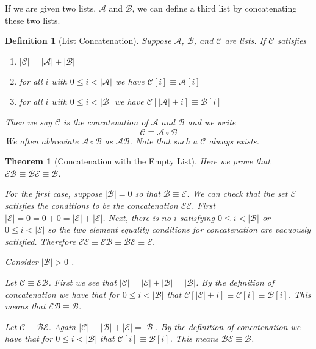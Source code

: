 \documentclass[12pt]{article}
\theoremstyle{break}
\newtheorem{definition}{Definition}[section]
\theoremstyle{break}
\newtheorem{theorem}{Theorem}[section]
\theoremstyle{break}
\theoremstyle{break}
\newcommand{\mc}[1]{\mathcal{#1}}
\begin{document}
If we are given two lists, $\mc{A}$ and $\mc{B}$, we can define a third list by concatenating these two lists.

\begin{definition}[List Concatenation]
Suppose $\mc{A}$, $\mc{B}$, and $\mc{C}$ are lists.
If $\mc{C}$ satisfies
\begin{enumerate}
\item{$|\mc{C}| = |\mc{A}| + |\mc{B}|$}
\item{for all $i$ with $0 \le i < |\mc{A}|$ we have $\mc{C}[i] \equiv \mc{A}[i]$}
\item{for all $i$ with $0 \le i < |\mc{B}|$ we have $\mc{C}[|\mc{A}| + i] \equiv \mc{B}[i]$}
\end{enumerate}
Then we say $\mc{C}$ is the concatenation of $\mc{A}$ and $\mc{B}$ and we write
$$
\mc{C} \equiv \mc{A}\circ \mc{B}
$$
We often abbreviate $\mc{A}\circ\mc{B}$ as $\mc{A}\mc{B}$.
Note that such a $\mc{C}$ always exists.
\end{definition}

\begin{theorem}[Concatenation with the Empty List]
Here we prove that $\mc{E}\mc{B} \equiv \mc{B} \mc{E} \equiv \mc{B}$.

For the first case, suppose $|\mc{B}|= 0$ so that $\mc{B}\equiv \mc{E}$.
We can check that the set $\mc{E}$ satisfies the conditions to be the concatenation $\mc{E}\mc{E}$. 
First $|\mc{E}| = 0 = 0 + 0 = |\mc{E}| + |\mc{E}|$. 
Next, there is no $i$ satisfying $0 \le i < |\mc{B}|$ or $0 \le i < |\mc{E}|$ so the two element equality conditions for concatenation are vacuously satisfied. 
Therefore $\mc{E}\mc{E} \equiv \mc{E}\mc{B} \equiv \mc{B}\mc{E} \equiv \mc{E}$.

Consider $|\mc{B}|>0$ .

Let $\mc{C} \equiv \mc{E}\mc{B}$. 
First we see that $|\mc{C}| = |\mc{E}| + |\mc{B}| = |\mc{B}|$.
By the definition of concatenation we have that for $0 \le i < |\mc{B}|$ that $\mc{C}[|\mc{E}| + i] \equiv \mc{C}[i] \equiv \mc{B}[i]$. 
This means that $\mc{E}\mc{B}\equiv\mc{B}$.

Let $\mc{C} \equiv \mc{B}\mc{E}$. 
Again $|\mc{C}| \equiv |\mc{B}|+|\mc{E}| = |\mc{B}|$. 
By the definition of concatenation we have that for $0 \le i < |\mc{B}|$ that $\mc{C}[i] \equiv \mc{B}[i]$. 
This means $\mc{B}\mc{E} \equiv \mc{B}$.
\end{theorem}
\end{document}
